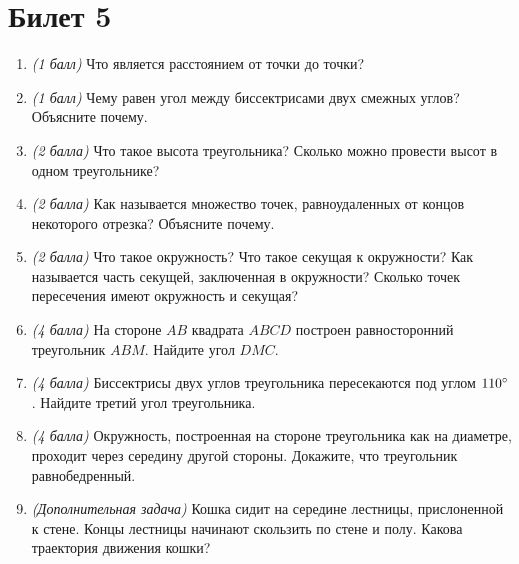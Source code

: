 \documentclass[12pt, a4paper]{article}
\begin{document}
\section*{Билет 5}
\begin{enumerate}
\item \textit{(1 балл)} Что является расстоянием от точки до точки?
\item \textit{(1 балл)} Чему равен угол между биссектрисами двух смежных углов? Объясните почему.
\item \textit{(2 балла)} Что такое высота треугольника? Сколько можно провести высот в одном треугольнике?
\item \textit{(2 балла)} Как называется множество точек, равноудаленных от концов некоторого отрезка? Объясните почему.
\item \textit{(2 балла)} Что такое окружность? Что такое секущая к окружности? Как называется часть секущей, заключенная в окружности? Сколько точек пересечения имеют окружность и секущая?
\item \textit{(4 балла)} На стороне $AB$ квадрата $ABCD$ построен равносторонний треугольник $ABM$. Найдите угол $DMC$.
\item \textit{(4 балла)} Биссектрисы двух углов треугольника пересекаются под углом $110\degree$. Найдите третий угол треугольника.
\item \textit{(4 балла)} Окружность, построенная на стороне треугольника как на диаметре, проходит через середину другой стороны. Докажите, что треугольник равнобедренный.
\item \textit{(Дополнительная задача)} Кошка сидит на середине лестницы, прислоненной к стене. Концы лестницы начинают скользить по стене и полу. Какова траектория движения кошки?
\end{enumerate}
\end{document}
